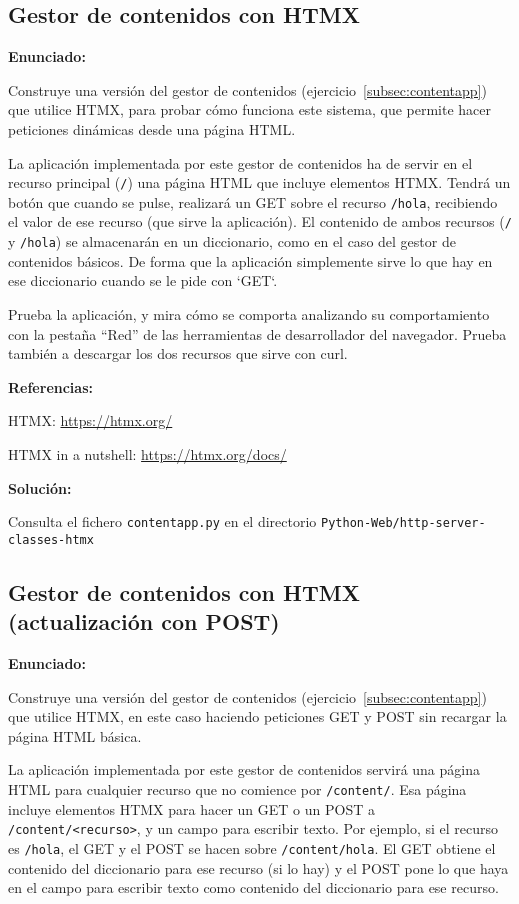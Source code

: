 {%
\subsection{Gestor de contenidos con HTMX}
\label{subsec:contentapp-htmx}

\textbf{Enunciado:}

Construye una versión del gestor de contenidos (ejercicio~\ref{subsec:contentapp}) que utilice HTMX, para probar cómo funciona este sistema, que permite hacer peticiones dinámicas desde una página HTML.

La aplicación implementada por este gestor de contenidos ha de servir en el recurso principal (\verb|/|) una página HTML que incluye elementos HTMX. Tendrá un botón que cuando se pulse, realizará un GET sobre el recurso \verb|/hola|, recibiendo el valor de ese recurso (que sirve la aplicación). El contenido de ambos recursos (\verb|/| y \verb|/hola|) se almacenarán en un diccionario, como en el caso del gestor de contenidos básicos. De forma que la aplicación simplemente sirve lo que hay en ese diccionario cuando se le pide con `GET`.

Prueba la aplicación, y mira cómo se comporta analizando su comportamiento con la pestaña ``Red'' de las herramientas de desarrollador del navegador. Prueba también a descargar los dos recursos que sirve con curl.

\textbf{Referencias:}

HTMX: \url{https://htmx.org/}

HTMX in a nutshell: \url{https://htmx.org/docs/}

\textbf{Solución:}

Consulta el fichero \texttt{contentapp.py} en el directorio \texttt{Python-Web/http-server-classes-htmx}

\subsection{Gestor de contenidos con HTMX (actualización con POST)}
\label{subsec:contentapp-htmx-post}

\textbf{Enunciado:}

Construye una versión del gestor de contenidos (ejercicio~\ref{subsec:contentapp}) que utilice HTMX, en este caso haciendo peticiones GET y POST sin recargar la página HTML básica.

La aplicación implementada por este gestor de contenidos servirá una página HTML para cualquier recurso que no comience por \verb|/content/|. Esa página incluye elementos HTMX para hacer un GET o un POST a \verb|/content/<recurso>|, y un campo para escribir texto. Por ejemplo, si el recurso es \verb|/hola|, el GET y el POST se hacen sobre \verb|/content/hola|. El GET obtiene el contenido del diccionario para ese recurso (si lo hay) y el POST pone lo que haya en el campo para escribir texto como contenido del diccionario para ese recurso.

}
